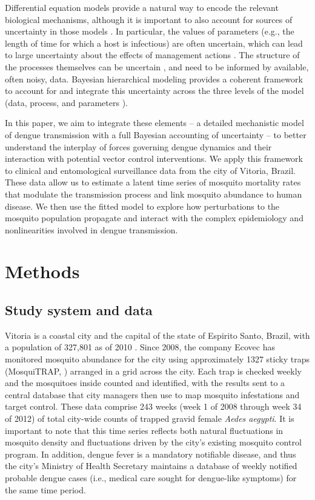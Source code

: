 \documentclass[10pt,letterpaper]{article}
\begin{document}
Differential equation models provide a natural way to encode the relevant biological mechanisms, although it is important to also account for sources of uncertainty in those models \cite{Hotelling1927, Wikle2010}.
In particular, the values of parameters (e.g., the length of time for which a host is infectious) are often uncertain, which can lead to large uncertainty about the effects of management actions \cite{Elderd2006}.
The structure of the processes themselves can be uncertain \cite{Ellner1998}, and need to be informed by available, often noisy, data.
Bayesian hierarchical modeling provides a coherent framework to account for and integrate this uncertainty across the three levels of the model (data, process, and parameters \cite{Berliner1996, Cressie2009}).

In this paper, we aim to integrate these elements -- a detailed mechanistic model of dengue transmission with a full Bayesian accounting of uncertainty --  to better understand the interplay of forces governing dengue dynamics and their interaction with potential vector control interventions.
We apply this framework to clinical and entomological surveillance data from the city of Vitoria, Brazil.
These data allow us to estimate a latent time series of mosquito mortality rates that modulate the transmission process and link mosquito abundance to human disease.  
We then use the fitted model to explore how perturbations to the mosquito population propagate and interact with the complex epidemiology and nonlinearities involved in dengue transmission.

\section*{Methods}

\subsection*{Study system and data}

Vitoria is a coastal city and the capital of the state of Espirito Santo, Brazil, with a population of 327,801 as of 2010 \cite{vitpop}.
Since 2008, the company Ecovec has monitored mosquito abundance for the city using approximately 1327 sticky traps (MosquiTRAP, \cite{Eiras2009}) arranged in a grid across the city.
Each trap is checked weekly and the mosquitoes inside counted and identified, with the results sent to a central database that city managers then use to map mosquito infestations and target control.
These data comprise 243 weeks (week 1 of 2008 through week 34 of 2012) of total city-wide counts of trapped gravid female \emph{Aedes aegypti}.
It is important to note that this time series reflects both natural fluctuations in mosquito density and fluctuations driven by the city's existing mosquito control program.
In addition, dengue fever is a mandatory notifiable disease, and thus the city's Ministry of Health Secretary maintains a database of weekly notified probable dengue cases (i.e., medical care sought for dengue-like symptoms) for the same time period.
\end{document}
